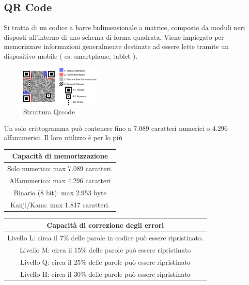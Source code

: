 \subsection{QR Code}
Si tratta di un codice a barre bidimensionale
a matrice, composto da moduli neri disposti all'interno di uno schema di forma quadrata. 
Viene impiegato per memorizzare informazioni generalmente destinate ad essere lette 
tramite un dispositivo mobile ( es. smartphone, tablet ).
\begin{flushright}
\begin{figure}[htbp]
   \centering
   \includegraphics[width=4cm]{img/qrcodestruct}
   \caption{Struttura Qrcode\label{qrgen}}
\end{figure}
\end{flushright}
Un solo crittogramma può contenere fino a 7.089 caratteri numerici o 4.296 alfanumerici.
Il loro utilizzo è per lo più
\begin{center}
\begin{tabular}{|c|}
\hline\textbf{ Capacità di memorizzazione} \\ 
\hline Solo numerico: max 7.089 caratteri. \\ 
\hline Alfanumerico: max 4.296 caratteri  \\ 
\hline  Binario (8 bit): max 2.953 byte \\ 
\hline Kanji/Kana: max 1.817 caratteri.\\
\hline 
\end{tabular} 
\linebreak 
\linebreak
\linebreak 
\linebreak
\begin{tabular}{|c|}
\hline\textbf{Capacità di correzione degli errori} \\ 
\hline  Livello L: circa il 7\%  delle parole in codice può essere ripristinato. \\ 
\hline  Livello M: circa il 15\% delle parole può essere ripristinato \\ 
\hline  Livello Q: circa il 25\% delle parole può essere ripristinato\\ 
\hline  Livello H: circa il 30\%  delle parole può essere ripristinato\\
\hline 
\end{tabular} 
\end{center}